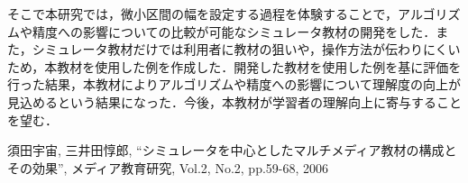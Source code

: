 \documentclass[a4paper, 12pt]{ltjsarticle}
\begin{document}
そこで本研究では，微小区間の幅を設定する過程を体験することで，アルゴリズムや精度への影響についての比較が可能なシミュレータ教材の開発をした．また，シミュレータ教材だけでは利用者に教材の狙いや，操作方法が伝わりにくいため，本教材を使用した例を作成した．開発した教材を使用した例を基に評価を行った結果，本教材によりアルゴリズムや精度への影響について理解度の向上が見込めるという結果になった．今後，本教材が学習者の理解向上に寄与することを望む．
\clearpage

\begin{thebibliography}{99}
 須田宇宙, 三井田惇郎, ``シミュレータを中心としたマルチメディア教材の構成とその効果'', メディア教育研究, Vol.2, No.2, pp.59-68, 2006
\end{thebibliography}
\end{document}

